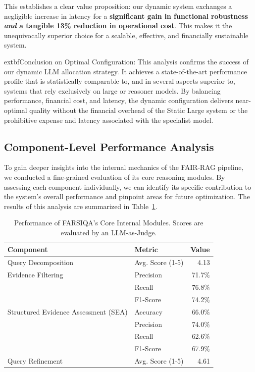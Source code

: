 \documentclass[11pt]{article}
\begin{document}
This establishes a clear value proposition: our dynamic system exchanges a negligible increase in latency for a \textbf{significant gain in functional robustness \emph{and} a tangible 13\% reduction in operational cost}. This makes it the unequivocally superior choice for a scalable, effective, and financially sustainable system.

	extbf{Conclusion on Optimal Configuration:} This analysis confirms the success of our dynamic LLM allocation strategy. It achieves a state-of-the-art performance profile that is statistically comparable to, and in several aspects superior to, systems that rely exclusively on large or reasoner models. By balancing performance, financial cost, and latency, the dynamic configuration delivers near-optimal quality without the financial overhead of the Static Large system or the prohibitive expense and latency associated with the specialist model.

\subsection{Component-Level Performance Analysis}

To gain deeper insights into the internal mechanics of the FAIR-RAG pipeline, we conducted a fine-grained evaluation of its core reasoning modules. By assessing each component individually, we can identify its specific contribution to the system's overall performance and pinpoint areas for future optimization. The results of this analysis are summarized in Table~\ref{tab:component-performance}.

\begin{table}[t]
\centering
\small
\begin{tabular}{llr}
\hline
\textbf{Component} & \textbf{Metric} & \textbf{Value} \\
\hline
Query Decomposition & Avg. Score (1-5) & 4.13 \\
\hline
Evidence Filtering & Precision & 71.7\% \\
& Recall & 76.8\% \\
& F1-Score & 74.2\% \\
\hline
Structured Evidence Assessment (SEA) & Accuracy & 66.0\% \\
& Precision & 74.0\% \\
& Recall & 62.6\% \\
& F1-Score & 67.9\% \\
\hline
Query Refinement & Avg. Score (1-5) & 4.61 \\
\hline
\end{tabular}
\caption{Performance of FARSIQA's Core Internal Modules. Scores are evaluated by an LLM-as-Judge.}
\label{tab:component-performance}
\end{table}
\end{document}
